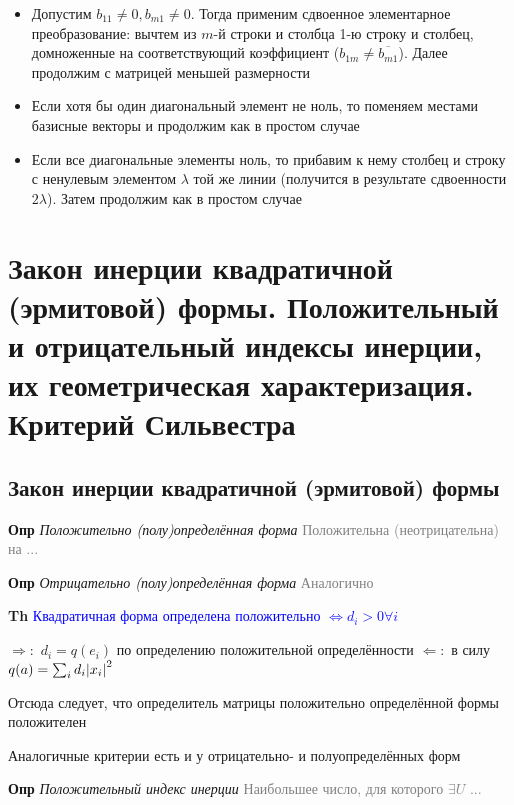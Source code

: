 \documentclass[a4paper, 14pt]{article}
\begin{document}
    \begin{itemize}
        \item Допустим $b_{11} \neq 0, b_{m1} \neq 0$.
        Тогда применим сдвоенное элементарное преобразование: вычтем из $m$-й строки и столбца 1-ю строку и столбец,
        домноженные на соответствующий коэффициент ($b_{1m} \neq \overline{b_{m1}}$).
        Далее продолжим с матрицей меньшей размерности
        \item Если хотя бы один диагональный элемент не ноль, то поменяем местами базисные векторы и продолжим
        как в простом случае
        \item Если все диагональные элементы ноль, то прибавим к нему столбец и строку с ненулевым элементом $\lambda$
        той же
        линии (получится в результате сдвоенности $2\lambda$). Затем продолжим как в простом случае
    \end{itemize}
    
    \section{Закон инерции квадратичной (эрмитовой) формы.
    Положительный и отрицательный индексы инерции, их геометрическая характеризация.
    Критерий Сильвестра}
    
    \subsection{Закон инерции квадратичной (эрмитовой) формы}
    
    \textbf{Опр} \textit{Положительно (полу)определённая форма} \textcolor{gray}{Положительна (неотрицательна) на ...}
    
    \textbf{Опр} \textit{Отрицательно (полу)определённая форма} \textcolor{gray}{Аналогично}
    
    \textbf{Th} \textcolor{blue}{Квадратичная форма определена положительно $\Leftrightarrow d_i > 0 \forall i$}
    
    $\Rightarrow:$ $d_i = q(e_i)$ по определению положительной определённости
    $\Leftarrow:$ в силу $q(a) = \sum_i d_i \abs{x_i}^2$
    
    Отсюда следует, что определитель матрицы положительно определённой формы положителен
    
    Аналогичные критерии есть и у отрицательно- и полуопределённых форм
    
    \textbf{Опр} \textit{Положительный индекс инерции} \textcolor{gray}{Наибольшее число, для которого $\exists U$ ...}
    
\end{document}
